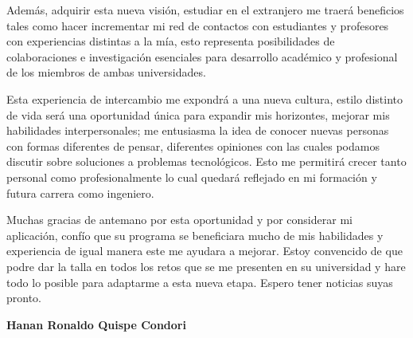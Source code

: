 \documentclass[12pt,a4paper,roman]{moderncv} %
\begin{document}
Además, adquirir esta nueva visión, estudiar en el extranjero me traerá beneficios tales como hacer incrementar mi red de contactos con estudiantes y profesores con experiencias distintas a la mía, esto representa posibilidades de colaboraciones e investigación esenciales para desarrollo académico y profesional de los miembros de ambas universidades.

Esta experiencia de intercambio me expondrá a una nueva cultura, estilo distinto de vida será una oportunidad única para expandir mis horizontes, mejorar mis habilidades interpersonales; me entusiasma la idea de conocer nuevas personas con formas diferentes de pensar, diferentes opiniones con las cuales podamos discutir sobre soluciones a problemas tecnológicos. Esto me permitirá crecer tanto personal como profesionalmente lo cual quedará reflejado en mi formación y futura carrera como ingeniero.

Muchas gracias de antemano por esta oportunidad y por considerar mi aplicación, confío que su programa se beneficiara mucho de mis habilidades y experiencia de igual manera este me ayudara a mejorar. Estoy convencido de que podre dar la talla en todos los retos que se me presenten en su universidad y hare todo lo posible para adaptarme a esta nueva etapa. Espero tener noticias suyas pronto.



\vfill
\textbf{Hanan Ronaldo Quispe Condori}
\end{document}

